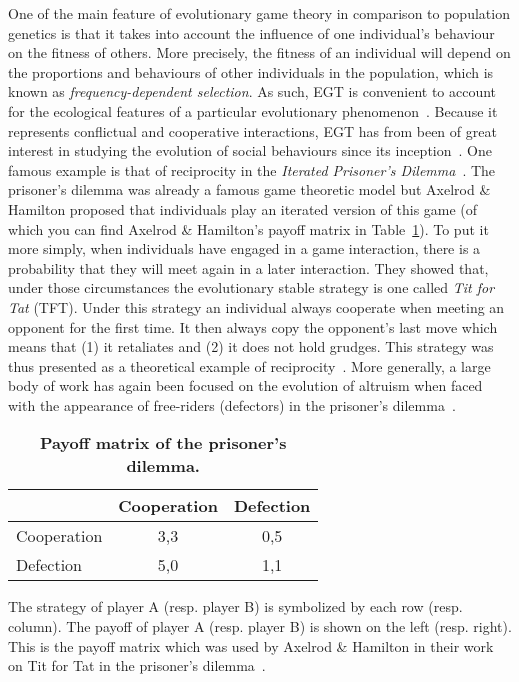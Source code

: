     One of the main feature of evolutionary game theory in comparison to population genetics is that it takes into account the influence of one individual's behaviour on the fitness of others. More precisely, the fitness of an individual will depend on the proportions and behaviours of other individuals in the population, which is known as \emph{frequency-dependent selection}. As such, EGT is convenient to account for the ecological features of a particular evolutionary phenomenon~\parencite{Hammerstein1994}. Because it represents conflictual and cooperative interactions, EGT has from been of great interest in studying the evolution of social behaviours since its inception~\parencite{Bshary2015}. One famous example is that of reciprocity in the \emph{Iterated Prisoner's Dilemma}~\parencite{Axelrod1984}. The prisoner's dilemma was already a famous game theoretic model but Axelrod \& Hamilton proposed that individuals play an iterated version of this game (of which you can find Axelrod \& Hamilton's payoff matrix in Table~\ref{table:payoffIPD}). To put it more simply, when individuals have engaged in a game interaction, there is a probability that they will meet again in a later interaction. They showed that, under those circumstances the evolutionary stable strategy is one called \emph{Tit for Tat} (TFT). Under this strategy an individual always cooperate when meeting an opponent for the first time. It then always copy the opponent's last move which means that (1) it retaliates and (2) it does not hold grudges. This strategy was thus presented as a theoretical example of reciprocity~\parencite{Trivers1971}. More generally, a large body of work has again been focused on the evolution of altruism when faced with the appearance of free-riders (defectors) in the prisoner's dilemma~\parencite{Requejo2013a}.


    \begin{table}[ht]
    \centering
      \caption{\textbf{Payoff matrix of the prisoner's dilemma.}}
      \begin{tabular}{l|c|c}
        & Cooperation & Defection \\
        \hline
        Cooperation & 3,3 & 0,5 \\
        \hline
        Defection & 5,0 & 1,1 \\
        \hline
      \end{tabular}
      \begin{flushleft} The strategy of player A (resp. player B) is symbolized by each row (resp. column). The payoff of player A (resp. player B) is shown on the left (resp. right). This is the payoff matrix which was used by Axelrod \& Hamilton in their work on Tit for Tat in the prisoner's dilemma~\parencite{Axelrod1984}. 
      \end{flushleft}
    \label{table:payoffIPD}
    \end{table}


